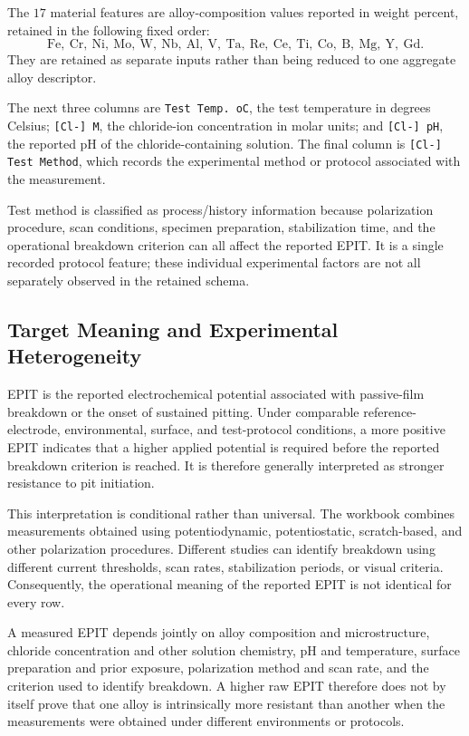 \documentclass{article}
\begin{document}
The \(17\) material features are alloy-composition values reported in weight
percent, retained in the following fixed order:
\[
\mathrm{Fe,\ Cr,\ Ni,\ Mo,\ W,\ Nb,\ Al,\ V,\ Ta,\ Re,\ Ce,\ Ti,\ Co,\ B,\ Mg,\ Y,\ Gd}.
\]
They are retained as separate inputs rather than being reduced to one
aggregate alloy descriptor.

The next three columns are \texttt{Test Temp. oC}, the test temperature in
degrees Celsius; \texttt{[Cl-] M}, the chloride-ion concentration in molar
units; and \texttt{[Cl-] pH}, the reported pH of the chloride-containing
solution. The final column is \texttt{[Cl-] Test Method}, which records the
experimental method or protocol associated with the measurement.

Test method is classified as process/history information because polarization
procedure, scan conditions, specimen preparation, stabilization time, and the
operational breakdown criterion can all affect the reported EPIT. It is a
single recorded protocol feature; these individual experimental factors are
not all separately observed in the retained schema.

\subsection{Target Meaning and Experimental Heterogeneity}

EPIT is the reported electrochemical potential associated with passive-film
breakdown or the onset of sustained pitting. Under comparable
reference-electrode, environmental, surface, and test-protocol conditions, a
more positive EPIT indicates that a higher applied potential is required
before the reported breakdown criterion is reached. It is therefore generally
interpreted as stronger resistance to pit initiation.

This interpretation is conditional rather than universal. The workbook
combines measurements obtained using potentiodynamic, potentiostatic,
scratch-based, and other polarization procedures. Different studies can
identify breakdown using different current thresholds, scan rates,
stabilization periods, or visual criteria. Consequently, the operational
meaning of the reported EPIT is not identical for every row.

A measured EPIT depends jointly on alloy composition and microstructure,
chloride concentration and other solution chemistry, pH and temperature,
surface preparation and prior exposure, polarization method and scan rate,
and the criterion used to identify breakdown. A higher raw EPIT therefore
does not by itself prove that one alloy is intrinsically more resistant than
another when the measurements were obtained under different environments or
protocols.
\end{document}
